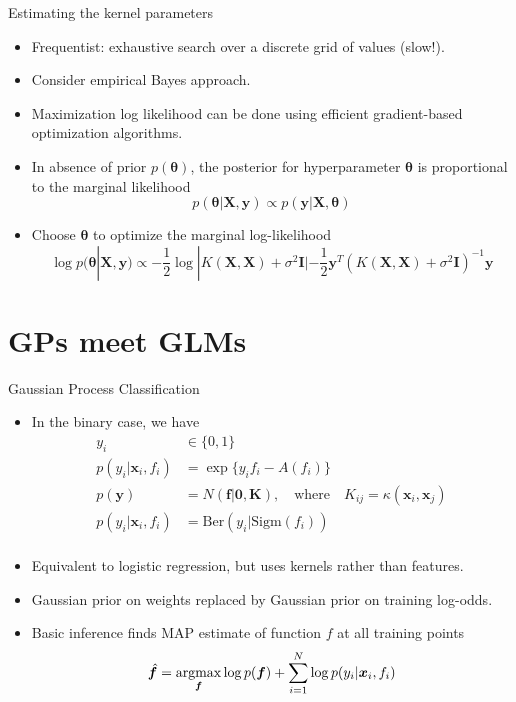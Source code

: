 \documentclass[10pt,mathserif]{beamer}
\begin{document}
\begin{frame}{Estimating the kernel parameters}
\begin{itemize}
    \item Frequentist: exhaustive search over a discrete grid of values (slow!).
    \item Consider empirical Bayes approach.
    \item Maximization log likelihood can be done using efficient gradient-based optimization algorithms.
    \item In absence of prior $p(\bm{\theta})$, the posterior for hyperparameter $\bm{\theta}$ is proportional to the marginal likelihood
    \begin{equation*}
        p(\bm{\theta}|\bm{X},\bm{y}) \propto p(\bm{y}|\bm{X},\bm{\theta})
    \end{equation*}
    \item Choose $\bm{\theta}$ to optimize the marginal log-likelihood
    \begin{equation*}
        \log p(\bm{\theta}|\bm{X},\bm{y}) \propto -\frac{1}{2}\log |K(\bm{X},\bm{X}) + \sigma^2\bm{I}| - \frac{1}{2}\bm{y}^T(K(\bm{X},\bm{X}) + \sigma^2\bm{I})^{-1}\bm{y}
    \end{equation*}
\end{itemize}  
\end{frame}

\section{GPs meet GLMs}
\begin{frame}{Gaussian Process Classification}
\begin{itemize}
    \item In the binary case, we have
    \begin{equation*}
        \begin{split}
            y_i & \in \{0,1 \}\\
            p(y_i|\bm{x}_i,f_i) & = \exp\{y_i f_i - A(f_i)\}\\
            p(\bm{y}) & = N(\bm{f}|\bm{0},\bm{K}), \quad \text{where} \quad K_{ij} = \kappa(\bm{x}_i, \bm{x}_j)\\
            p(y_i|\bm{x}_i,f_i) & = \text{Ber}(y_i|\text{Sigm}(f_i))\\
        \end{split}
    \end{equation*}
    \item Equivalent to logistic regression, but uses kernels rather than features.
    \item Gaussian prior on weights replaced by Gaussian prior on training log-odds.
    \item Basic inference finds MAP estimate of function $f$ at all training points
    \begin{equation*}
        \hat{\bm{f}} = \mathop{\rm argmax}_{\bm{f}}\log p(\bm{f}) + \sum_{i=1}^N \log p(y_i|\bm{x}_i,f_i)
    \end{equation*}
\end{itemize}    
\end{frame}
\end{document}
